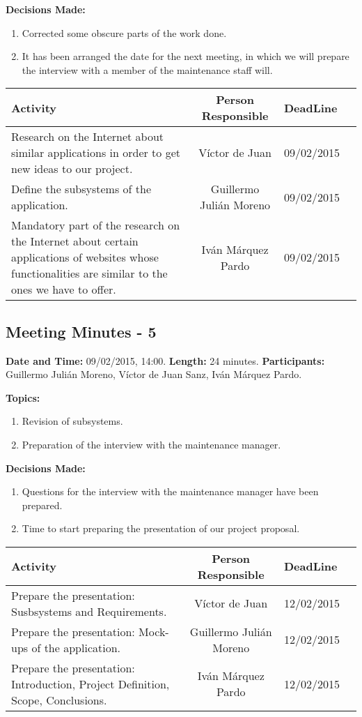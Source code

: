\textbf{Decisions Made:}\\
\begin{enumerate}
\item Corrected some obscure parts of the work done.
\item It has been arranged the date for the next meeting, in which we will prepare the interview with a member of the maintenance staff will.
\end{enumerate}

\begin{tabular}{|p{5cm} c|p{5cm}|p{5cm}|}
\hline Activity & Person Responsible & DeadLine \\\hline
Research on the Internet about similar applications in order to get new ideas to our project. & Víctor de Juan & 09/02/2015\\\hline

Define the subsystems of the application. & Guillermo Julián Moreno & 09/02/2015\\\hline

Mandatory part of the research on the Internet about certain applications of websites whose functionalities are similar to the ones we have to offer. & Iván Márquez Pardo & 09/02/2015\\\hline
\end{tabular}


\subsection{Meeting Minutes - 5}
\textbf{Date and Time:} 09/02/2015, 14:00. 
\textbf{Length:} 24 minutes. 
\textbf{Participants: } Guillermo Julián Moreno, Víctor de Juan Sanz, Iván Márquez Pardo.

\textbf{Topics: } 
\begin{enumerate}
\item Revision of subsystems.
\item Preparation of the interview with the maintenance manager.
\end{enumerate}

\textbf{Decisions Made:}\\
\begin{enumerate}
\item Questions for the interview with the maintenance manager have been prepared.
\item Time to start preparing the presentation of our project proposal.
\end{enumerate}

\begin{tabular}{|p{5cm} c|p{5cm}|p{5cm}|}
\hline Activity & Person Responsible & DeadLine \\\hline
Prepare the presentation: Susbsystems and Requirements. & Víctor de Juan & 12/02/2015\\\hline

Prepare the presentation: Mock-ups of the application. & Guillermo Julián Moreno & 12/02/2015\\\hline

Prepare the presentation: Introduction, Project Definition, Scope, Conclusions. & Iván Márquez Pardo & 12/02/2015\\\hline
\end{tabular}


